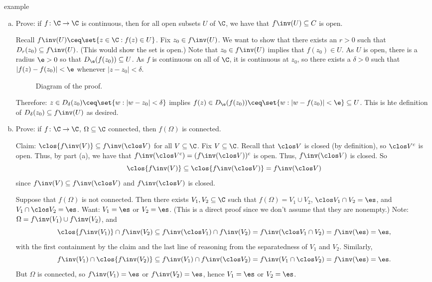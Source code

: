 \documentclass[class=article, crop=false]{standalone}
\begin{document}
\begin{understandingcheck}{example}
  \begin{enumerate}[(a)]
    \item Prove: if $f\colon \C \to \C$ is continuous, then for all open subsets $U$ of $\C$, we have that $f\inv(U)\subseteq C$ is open.
      \begin{pf}
        Recall $f \inv(U) \ceq \set{z \in \C : f(z)\in U}$. Fix $z_0 \in f\inv(U)$. We want to show that there exists an $r > 0$ such that $D_r(z_0) \subseteq f\inv(U)$. (This would show the set is open.) Note that $z_0 \in f\inv(U)$ implies that $f(z_0) \in U$. As $U$ is open, there is a radius $\e > 0$ so that $D_\e(f(z_0)) \subseteq U$. As $f$ is continuous on all of $\C$, it is continuous at $z_0$, so there exists a $\delta > 0$ such that $|f(z)-f(z_0)|<\e$ whenever $|z-z_0| < \delta$.

        \begin{figure}[ht]
          \center
          \caption{Diagram of the proof.}
        \end{figure}


        Therefore: $z \in D_\delta(z_0) \ceq \set{w: |w-z_0|<\delta}$ implies $f(z) \in D_\e(f(z_0)) \ceq\set{w : |w-f(z_0)|<\e} \subseteq U$. This is hte definition of $D_\delta(z_0) \subseteq f\inv(U)$ as desired.
      \end{pf}

    \item Prove: if $f\colon \C\to\C$, $\Omega \subseteq \C$ connected, then $f(\Omega)$ is connected.
      \begin{pf}
        Claim: $\clos{f\inv(V)} \subseteq f\inv(\clos V)$ for all $V \subseteq \C$. Fix $V \subseteq \C$. Recall that $\clos V$ is closed (by definition), so $\clos V^c$ is open. Thus, by part (a), we have that $f\inv(\clos V^c) = (f\inv(\clos V))^c$ is open. Thus, $f\inv(\clos V)$ is closed. So
          \[
            \clos{f\inv(V)}\subseteq \clos{f\inv(\clos V)} = f\inv(\clos V)
          \]
        since $f\inv(V) \subseteq f\inv(\clos V)$ and $f\inv(\clos V)$ is closed.

        Suppose that $f(\Omega)$ is not connected. Then there exists $V_1, V_2 \subseteq \C$ such that $f(\Omega) = V_1 \cup V_2$, $\clos V_1 \cap V_2 = \es$, and $V_1 \cap \clos V_2 = \es$. Want: $V_1 = \es$ or $V_2 = \es$. (This is a direct proof since we don't assume that they are nonempty.) Note: $\Omega = f\inv(V_1) \cup f\inv(V_2)$, and
          \[
            \clos{f\inv(V_1)} \cap f\inv(V_2) \subseteq f\inv(\clos V_1) \cap f\inv(V_2)= f\inv(\clos V_1\cap V_2) = f\inv(\es) = \es,
          \]
        with the first containment by the claim and the last line of reasoning from the separatedness of $V_1$ and $V_2$. Similarly,
          \[
            f\inv(V_1) \cap \clos{f\inv(V_2)} \subseteq f\inv(V_1) \cap f\inv(\clos V_2) = f\inv(V_1 \cap \clos V_2) = f\inv(\es) = \es.
          \]
         But $\Omega$ is connected, so $f\inv(V_1) = \es$ or $f\inv(V_2) = \es$, hence $V_1 = \es$ or $V_2 = \es$.
      \end{pf}
  \end{enumerate}
\end{understandingcheck}
\end{document}
